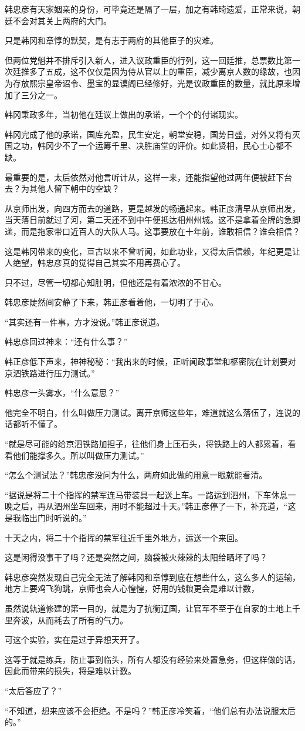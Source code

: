 韩忠彦有天家姻亲的身份，可毕竟还是隔了一层，加之有韩琦遗爱，正常来说，朝廷不会对其关上两府的大门。

只是韩冈和章惇的默契，是有志于两府的其他臣子的灾难。

但两位党魁并不排斥引入新人，进入议政重臣的行列，这一回廷推，总票数比第一次廷推多了五成，这不仅仅是因为侍从官以上的重臣，减少离京人数的缘故，也因为存放熙宗皇帝诏令、墨宝的显谟阁已经修好，光是议政重臣的数量，就比原来增加了三分之一。

韩冈秉政多年，当初他在廷议上做出的承诺，一个个的付诸现实。

韩冈完成了他的承诺，国库充盈，民生安定，朝堂安稳，国势日盛，对外又将有灭国之功，韩冈少不了一个运筹千里、决胜庙堂的评价。如此贤相，民心士心都不缺。

最重要的是，太后依然对他言听计从，这样一来，还能指望他过两年便被赶下台去？为其他人留下朝中的空缺？

从京师出发，向四方而去的道路，更是越发的畅通起来。韩正彦清早从京师出发，当天落日前就过了河，第二天还不到中午便抵达相州州城。这不是拿着金牌的急脚递，而是拖家带口近百人的大队人马。这事要放在十年前，谁敢相信？谁会相信？

这是韩冈带来的变化，亘古以来不曾听闻，如此功业，又得太后信赖，年纪更是让人绝望，韩忠彦真的觉得自己其实不用再费心了。

只不过，尽管一切都心知肚明，但他还是有着浓浓的不甘心。

韩忠彦陡然间安静了下来，韩正彦看着他，一切明了于心。

“其实还有一件事，方才没说。”韩正彦说道。

韩忠彦回过神来：“还有什么事？”

韩正彦低下声来，神神秘秘：“我出来的时候，正听闻政事堂和枢密院在计划要对京泗铁路进行压力测试。”

韩忠彦一头雾水，“什么意思？”

他完全不明白，什么叫做压力测试。离开京师这些年，难道就这么落伍了，连说的话都听不懂了。

“就是尽可能的给京泗铁路加担子，往他们身上压石头，将铁路上的人都累着，看看他们能撑多久。所以叫做压力测试。”

“怎么个测试法？”韩忠彦没问为什么，两府如此做的用意一眼就能看清。

“据说是将二十个指挥的禁军连马带装具一起送上车。一路运到泗州，下车休息一晚之后，再从泗州坐车回来，用时不能超过十天。”韩正彦停了一下，补充道，“这是我临出门时听说的。”

十天之内，将二十个指挥的禁军往近千里外地方，运送一个来回。

这是闲得没事干了吗？还是突然之间，脑袋被火辣辣的太阳给晒坏了吗？

韩忠彦突然发现自己完全无法了解韩冈和章惇到底在想些什么，这么多人的运输，地方上要鸡飞狗跳，京师也会人心惶惶，好用的钱粮更会是难以计数，

虽然说轨道修建的第一目的，就是为了抗衡辽国，让官军不至于在自家的土地上千里奔波，从而耗去了所有的气力。

可这个实验，实在是过于异想天开了。

这等于就是练兵，防止事到临头，所有人都没有经验来处置急务，但这样做的话，因此而带来的损失，将是难以计数。

“太后答应了？”

“不知道，想来应该不会拒绝。不是吗？”韩正彦冷笑着，“他们总有办法说服太后的。”